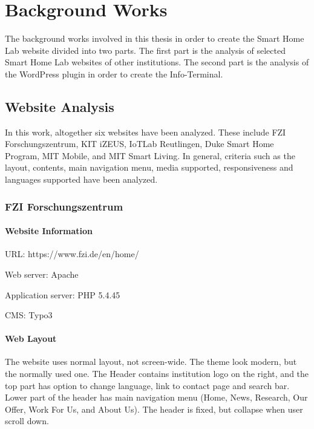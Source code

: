 \chapter{Background Works}
The background works involved in this thesis in order to create the Smart Home Lab website divided into two parts. The first part is the analysis of selected Smart Home Lab websites of other institutions. The second part is the analysis of the WordPress plugin in order to create the Info-Terminal.

\section{Website Analysis}
In this work, altogether six websites have been analyzed. These include FZI Forschungszentrum, KIT iZEUS, IoTLab Reutlingen, Duke Smart Home Program, MIT Mobile, and MIT Smart Living. In general, criteria such as the layout, contents, main navigation menu, media supported, responsiveness and languages supported have been analyzed.

\subsection{FZI Forschungszentrum}

\subsubsection*{Website Information}
\begin{itemize*}
\item URL: https://www.fzi.de/en/home/
\item Web server: Apache
\item Application server: PHP 5.4.45
\item CMS: Typo3
\end{itemize*}

\subsubsection*{Web Layout}
The website \cite{fzi-2017} uses normal layout, not screen-wide. The theme look modern, but the normally used one. The Header contains institution logo on the right, and the top part has option to change language, link to contact page and search bar. Lower part of the header has main navigation menu (Home, News, Research, Our Offer, Work For Us, and About Us). The header is fixed, but collapse when user scroll down.

